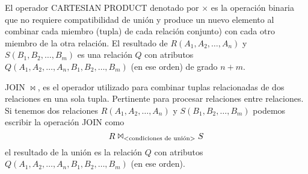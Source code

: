 El operador CARTESIAN PRODUCT denotado por $\times$ es la operación binaria que no requiere compatibilidad de unión y produce un nuevo elemento al combinar cada miembro (tupla) de cada relación conjunto) con cada otro miembro de la otra relación. El resultado de $R(A_1,A_2,\ldots,A_n)$ y $S(B_1,B_2,\ldots,B_m)$ es una relación $Q$ con atributos $Q(A_1,A_2,\ldots,A_n,B_1,B_2,\ldots,B_m)$ (en ese orden) de grado $n+m$.

JOIN $\Join$, es el operador utilizado para combinar tuplas relacionadas de dos relaciones en una sola tupla. Pertinente para procesar relaciones entre relaciones. Si tenemos dos relaciones $R(A_1,A_2,\ldots,A_n)$ y $S(B_1,B_2,\ldots,B_m)$ podemos escribir la operación JOIN como
\begin{equation}
R\Join_\text{\textless condiciones de unión\textgreater}S
\end{equation}
el resultado de la unión es la relación $Q$ con atributos $Q(A_1,A_2,\ldots,A_n,B_1,B_2,\ldots,B_m)$ (en ese orden).